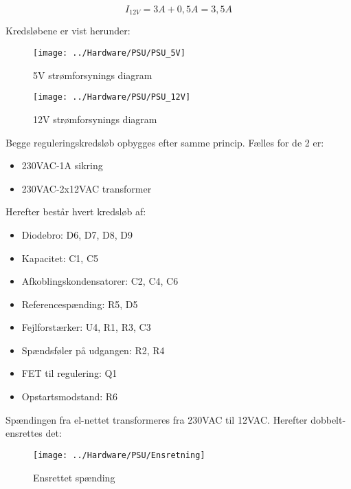 \begin{equation}
	I_{12V} = 3A + 0,5A = 3,5A
\end{equation}

Kredsløbene er vist herunder:
\begin{figure}[H]
	\centering
	\texttt{[image: ../Hardware/PSU/PSU\_5V]}
	\caption{5V strømforsynings diagram}
	\label{photo:PSU_5V}
\end{figure}

\begin{figure}[H]
	\centering
	\texttt{[image: ../Hardware/PSU/PSU\_12V]}
	\caption{12V strømforsynings diagram}
	\label{photo:PSU_12V}
\end{figure}

Begge reguleringskredsløb opbygges efter samme princip. Fælles for de 2 er:
\begin{itemize}
\item 230VAC-1A sikring
\item 230VAC-2x12VAC transformer
\end{itemize}

Herefter består hvert kredsløb af:
\begin{itemize}
\item Diodebro: D6, D7, D8, D9
\item Kapacitet: C1, C5
\item Afkoblingskondensatorer: C2, C4, C6
\item Referencespænding: R5, D5
\item Fejlforstærker: U4, R1, R3, C3
\item Spændsføler på udgangen: R2, R4
\item FET til regulering: Q1
\item Opstartsmodstand: R6
\end{itemize}

Spændingen fra el-nettet transformeres fra 230VAC til 12VAC. Herefter dobbelt-ensrettes det:

\begin{figure}[H]
	\centering
	\texttt{[image: ../Hardware/PSU/Ensretning]}
	\caption{Ensrettet spænding}
	\label{photo:Ensrettet}
\end{figure}

